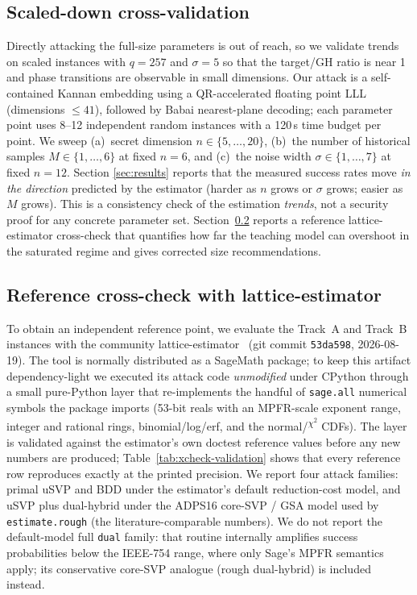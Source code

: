 \documentclass[11pt]{article}
\begin{document}
\subsection{Scaled-down cross-validation}
Directly attacking the full-size parameters is out of reach, so we validate
trends on scaled instances with $q=257$ and $\sigma=5$ so that the target/GH
ratio is near 1 and phase transitions are observable in small dimensions.  Our
attack is a self-contained Kannan embedding using a QR-accelerated floating
point LLL (dimensions $\le 41$), followed by Babai nearest-plane decoding; each
parameter point uses 8--12 independent random instances with a 120\,s time
budget per point.  We sweep (a)~secret dimension $n \in \{5,\dots,20\}$,
(b)~the number of historical samples $M \in \{1,\dots,6\}$ at fixed $n=6$, and
(c)~the noise width $\sigma \in \{1,\dots,7\}$ at fixed $n=12$.  Section
\ref{sec:results} reports that the measured success rates move \emph{in the
direction} predicted by the estimator (harder as $n$ grows or $\sigma$ grows;
easier as $M$ grows).  This is a consistency check of the estimation
\emph{trends}, not a security proof for any concrete parameter set.
Section~\ref{sec:crosscheck} reports a reference lattice-estimator
cross-check that quantifies how far the teaching model can overshoot in the
saturated regime and gives corrected size recommendations.

\subsection{Reference cross-check with lattice-estimator}\label{sec:crosscheck}

To obtain an independent reference point, we evaluate the Track~A and Track~B
instances with the community lattice-estimator~\cite{albrecht2018estimator}
(git commit \texttt{53da598}, 2026-08-19).  The tool is normally distributed
as a SageMath package; to keep this artifact dependency-light we executed its
attack code \emph{unmodified} under CPython through a small pure-Python layer
that re-implements the handful of \texttt{sage.all} numerical symbols the
package imports (53-bit reals with an MPFR-scale exponent range, integer and
rational rings, binomial/log/erf, and the normal/\textsuperscript{$\chi^2$}
CDFs).  The layer is validated against the estimator's own doctest reference
values before any new numbers are produced; Table~\ref{tab:xcheck-validation}
shows that every reference row reproduces exactly at the printed precision.
We report four attack families: primal uSVP and BDD under the estimator's
default reduction-cost model, and uSVP plus dual-hybrid under the ADPS16
core-SVP / GSA model used by \texttt{estimate.rough} (the
literature-comparable numbers).  We do not report the default-model full
\texttt{dual} family: that routine internally amplifies success probabilities
below the IEEE-754 range, where only Sage's MPFR semantics apply; its
conservative core-SVP analogue (rough dual-hybrid) is included instead.
\end{document}
